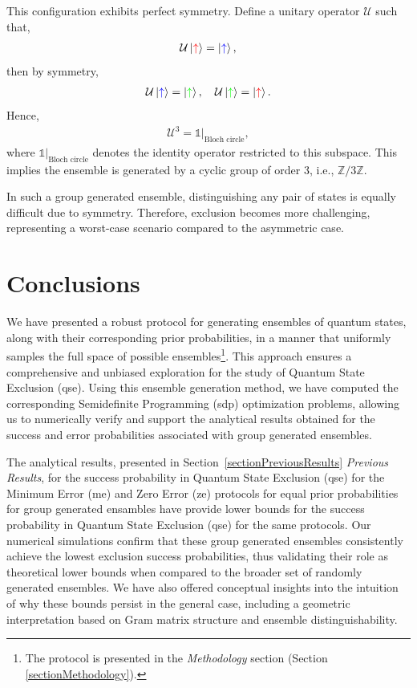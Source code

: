 \documentclass[12pt,letterpaper]{article}
\begin{document}
This configuration exhibits perfect symmetry. Define a unitary operator $\mathcal{U}$ such that,
\begin{align*}
\mathcal{U} \ket{\textcolor{red}{\uparrow}} = \ket{\textcolor{blue}{\uparrow}},
\end{align*}
then by symmetry,
\begin{align*}
\mathcal{U} \ket{\textcolor{blue}{\uparrow}} = \ket{\textcolor{green}{\uparrow}}, \quad \mathcal{U} \ket{\textcolor{green}{\uparrow}} = \ket{\textcolor{red}{\uparrow}}.
\end{align*}
Hence,
\begin{align*}
\mathcal{U}^3 = \mathds{1}|_{\text{Bloch circle}},
\end{align*}
where $\mathds{1}|_{\text{Bloch circle}}$ denotes the identity operator restricted to this subspace. This implies the ensemble is generated by a cyclic group of order 3, i.e., $\mathbb{Z}/3\mathbb{Z}$.

In such a group generated ensemble, distinguishing any pair of states is equally difficult due to symmetry. Therefore, exclusion becomes more challenging, representing a worst-case scenario compared to the asymmetric case.

\newpage
\section{Conclusions}

\hspace{20pt}We have presented a robust protocol for generating ensembles of quantum states, along with their corresponding prior probabilities, in a manner that uniformly samples the full space of possible ensembles\footnote{The protocol is presented in the \emph{Methodology} section (Section \ref{sectionMethodology}). }. This approach ensures a comprehensive and unbiased exploration for the study of Quantum State Exclusion (\gls{qse}). Using this ensemble generation method, we have computed the corresponding Semidefinite Programming (\gls{sdp}) optimization problems, allowing us to numerically verify and support the analytical results obtained for the success and error probabilities associated with group generated ensembles.

The analytical results, presented in Section~\ref{sectionPreviousResults} \emph{Previous Results}, for the success probability in Quantum State Exclusion (\gls{qse}) for the Minimum Error (\gls{me}) and Zero Error (\gls{ze}) protocols for equal prior probabilities for group generated ensambles have provide lower bounds for the success probability in Quantum State Exclusion (\gls{qse}) for the same protocols. Our numerical simulations confirm that these group generated ensembles consistently achieve the lowest exclusion success probabilities, thus validating their role as theoretical lower bounds when compared to the broader set of randomly generated ensembles. We have also offered conceptual insights into the intuition of why these bounds persist in the general case, including a geometric interpretation based on Gram matrix structure and ensemble distinguishability.
\end{document}
